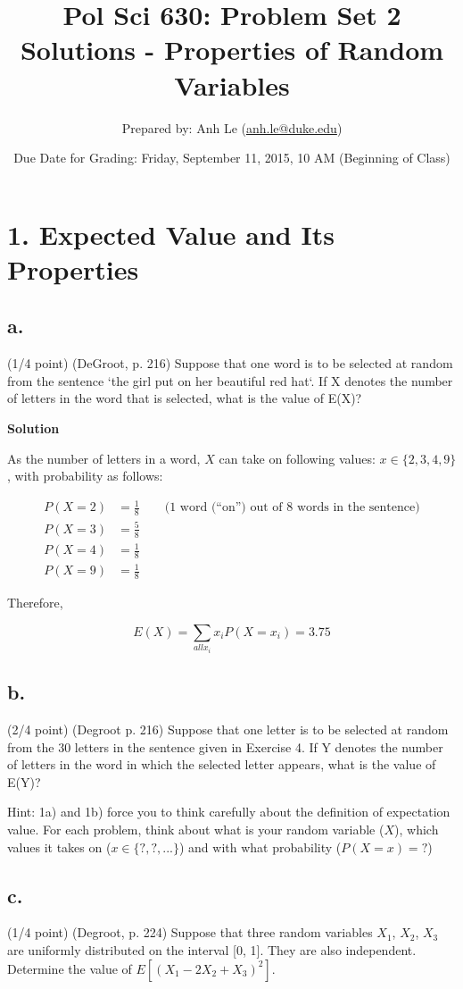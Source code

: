 \documentclass{article}\usepackage[]{graphicx}\usepackage[]{color}
\title{Pol Sci 630: Problem Set 2 Solutions - Properties of Random Variables}
\author{Prepared by: Anh Le (\href{mailto:anh.le@duke.edu}{anh.le@duke.edu})}
\date{Due Date for Grading: Friday, September 11, 2015, 10 AM (Beginning of Class)}
\begin{document}
\maketitle

\section*{1. Expected Value and Its Properties}

\subsection*{a.} (1/4 point) (DeGroot, p. 216) Suppose that one word is to be selected at random from the sentence `the girl put on her beautiful red hat`. If X denotes the number of letters in the word that is selected, what is the value of E(X)?

\textbf{Solution}

As the number of letters in a word, $X$ can take on following values: $x \in \{2, 3, 4, 9 \}$, with probability as follows:

\begin{align}
P(X = 2) &= \frac{1}{8} \qquad \text{(1 word (``on'') out of 8 words in the sentence)} \\
P(X = 3) &= \frac{5}{8} \\
P(X = 4) &= \frac{1}{8} \\
P(X = 9) &= \frac{1}{8}
\end{align}

Therefore,

$$E(X) = \sum_{all x_i} x_i P(X = x_i) = 3.75$$

\subsection*{b.} (2/4 point) (Degroot p. 216) Suppose that one letter is to be selected at random from
the 30 letters in the sentence given in Exercise 4. If Y
denotes the number of letters in the word in which the
selected letter appears, what is the value of E(Y)?

Hint: 1a) and 1b) force you to think carefully about the definition of expectation value. For each problem, think about what is your random variable ($X$), which values it takes on ($x \in \{?, ?, ...\}$) and with what probability ($P(X = x) = ?$)

\subsection*{c.} (1/4 point) (Degroot, p. 224) Suppose that three random variables $X_1$, $X_2$, $X_3$ are uniformly distributed on the interval [0, 1]. They are also independent. Determine the value of $E[(X_1 − 2X_2 + X_3)^2]$.
\end{document}
